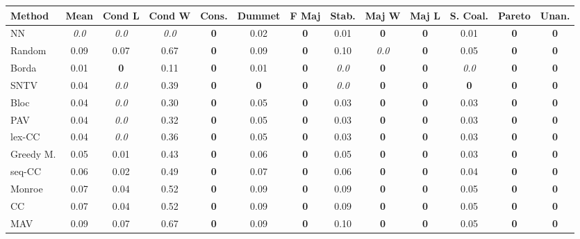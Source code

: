 \begin{tabular}{lcccccccccccc}
\toprule
Method & Mean & Cond L & Cond W & Cons. & Dummet & F Maj & Stab. & Maj W & Maj L & S. Coal. & Pareto & Unan. \\
\midrule
NN & \textit{0.0} & \textit{0.0} & \textit{0.0} & \textbf{0} & 0.02 & \textbf{0} & 0.01 & \textbf{0} & \textbf{0} & 0.01 & \textbf{0} & \textbf{0} \\
Random & 0.09 & 0.07 & 0.67 & \textbf{0} & 0.09 & \textbf{0} & 0.10 & \textit{0.0} & \textbf{0} & 0.05 & \textbf{0} & \textbf{0} \\
Borda & 0.01 & \textbf{0} & 0.11 & \textbf{0} & 0.01 & \textbf{0} & \textit{0.0} & \textbf{0} & \textbf{0} & \textit{0.0} & \textbf{0} & \cellcolor{green!25}\textbf{0} \\
SNTV & 0.04 & \textit{0.0} & 0.39 & \textbf{0} & \textbf{0} & \textbf{0} & \textit{0.0} & \textbf{0} & \textbf{0} & \textbf{0} & \textbf{0} & \textbf{0} \\
Bloc & 0.04 & \textit{0.0} & 0.30 & \textbf{0} & 0.05 & \textbf{0} & 0.03 & \textbf{0} & \textbf{0} & 0.03 & \textbf{0} & \textbf{0} \\
PAV & 0.04 & \textit{0.0} & 0.32 & \textbf{0} & 0.05 & \textbf{0} & 0.03 & \textbf{0} & \textbf{0} & 0.03 & \cellcolor{green!25}\textbf{0} & \textbf{0} \\
lex-CC & 0.04 & \textit{0.0} & 0.36 & \textbf{0} & 0.05 & \textbf{0} & 0.03 & \textbf{0} & \textbf{0} & 0.03 & \textbf{0} & \textbf{0} \\
Greedy M. & 0.05 & 0.01 & 0.43 & \textbf{0} & 0.06 & \textbf{0} & 0.05 & \textbf{0} & \textbf{0} & 0.03 & \textbf{0} & \textbf{0} \\
seq-CC & 0.06 & 0.02 & 0.49 & \textbf{0} & 0.07 & \textbf{0} & 0.06 & \textbf{0} & \textbf{0} & 0.04 & \textbf{0} & \textbf{0} \\
Monroe & 0.07 & 0.04 & 0.52 & \cellcolor{green!25}\textbf{0} & 0.09 & \textbf{0} & 0.09 & \textbf{0} & \textbf{0} & 0.05 & \textbf{0} & \cellcolor{green!25}\textbf{0} \\
CC & 0.07 & 0.04 & 0.52 & \cellcolor{green!25}\textbf{0} & 0.09 & \textbf{0} & 0.09 & \textbf{0} & \textbf{0} & 0.05 & \textbf{0} & \textbf{0} \\
MAV & 0.09 & 0.07 & 0.67 & \textbf{0} & 0.09 & \textbf{0} & 0.10 & \textbf{0} & \textbf{0} & 0.05 & \textbf{0} & \textbf{0} \\
\bottomrule
\end{tabular}

